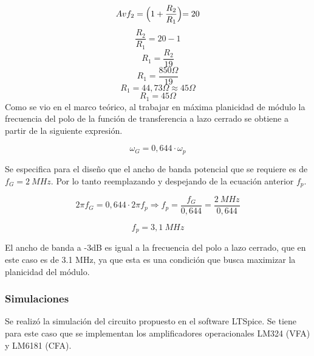 \begin{equation}
    Avf_2 = \Bigl(1 + \frac{R_2}{R_1}\Bigl) = 20
\end{equation}
\begin{equation}
    \frac{R_2}{R_1} = 20-1
\end{equation}
\begin{equation}
    R_1 =\frac{R_2}{19}
\end{equation}
\begin{equation}
    R_1 =\frac{850\Omega}{19}
\end{equation}
\begin{equation}
    R_1 =44,73\Omega \approx 45\Omega
\end{equation}
\begin{equation}
    \boxed{
    R_1 =45\Omega
    }
\end{equation}
\bigskip
\hspace{1mm} Como se vio en el marco teórico, al trabajar en máxima planicidad de módulo la frecuencia del polo de la función de transferencia a lazo cerrado se obtiene a partir de la siguiente expresión.

\begin{equation}
    \omega _G = 0,644 \cdot \omega _p 
\end{equation}

\bigskip
\hspace{1mm} Se especifica para el diseño que el ancho de banda potencial que se requiere es de \( f_G = 2~MHz \). Por lo tanto reemplazando y despejando de la ecuación anterior \( f_p \).

\begin{equation}
    2\pi f_G = 0,644 \cdot 2\pi f_p \Longrightarrow f_p = \frac{f_G}{0,644} = \frac{2~MHz}{0,644}
\end{equation}

\begin{equation}
    \boxed{
    f_p = 3,1~MHz
    }
\end{equation}

\bigskip
\hspace{1mm} El ancho de banda a -3dB es igual a la frecuencia del polo a lazo cerrado, que en este caso es de 3.1 MHz, ya que esta es una condición que busca maximizar la planicidad del módulo.

\subsubsection{Simulaciones}

\hspace{1mm} Se realizó la simulación del circuito propuesto en el software LTSpice. Se tiene para este caso que se implementan los amplificadores operacionales LM324 (VFA) y LM6181 (CFA).

